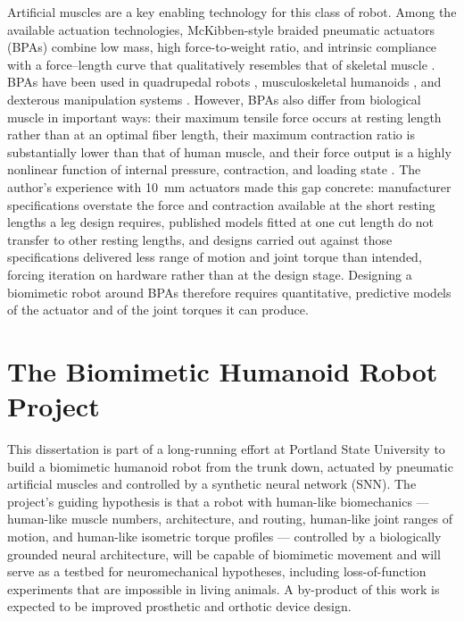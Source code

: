 Artificial muscles are a key enabling technology for this class of robot. Among the available actuation technologies, McKibben-style braided pneumatic actuators (BPAs) combine low mass, high force-to-weight ratio, and intrinsic compliance with a force--length curve that qualitatively resembles that of skeletal muscle \citep{liang_comparative_2020, hunt_modeling_2017}. BPAs have been used in quadrupedal robots \citep{aschenbeck_design_2006, hunt_modeling_2017, scharzenberger_design_2019}, musculoskeletal humanoids \citep{asano_design_2017, hitzmann_anthropomorphic_2018}, and dexterous manipulation systems \citep{chen_realizing_2019}. However, BPAs also differ from biological muscle in important ways: their maximum tensile force occurs at resting length rather than at an optimal fiber length, their maximum contraction ratio is substantially lower than that of human muscle, and their force output is a highly nonlinear function of internal pressure, contraction, and loading state \citep{hunt_modeling_2017, sarosi_comparative_2017, liang_comparative_2020}. The author's experience with \qty{10}{\mm} actuators made this gap concrete: manufacturer specifications overstate the force and contraction available at the short resting lengths a leg design requires, published models fitted at one cut length do not transfer to other resting lengths, and designs carried out against those specifications delivered less range of motion and joint torque than intended, forcing iteration on hardware rather than at the design stage. Designing a biomimetic robot around BPAs therefore requires quantitative, predictive models of the actuator and of the joint torques it can produce.

\section{The Biomimetic Humanoid Robot Project}\label{sec:project}

This dissertation is part of a long-running effort at Portland State University to build a biomimetic humanoid robot from the trunk down, actuated by pneumatic artificial muscles and controlled by a synthetic neural network (SNN). The project's guiding hypothesis is that a robot with human-like biomechanics --- human-like muscle numbers, architecture, and routing, human-like joint ranges of motion, and human-like isometric torque profiles --- controlled by a biologically grounded neural architecture, will be capable of biomimetic movement and will serve as a testbed for neuromechanical hypotheses, including loss-of-function experiments that are impossible in living animals. A by-product of this work is expected to be improved prosthetic and orthotic device design.

